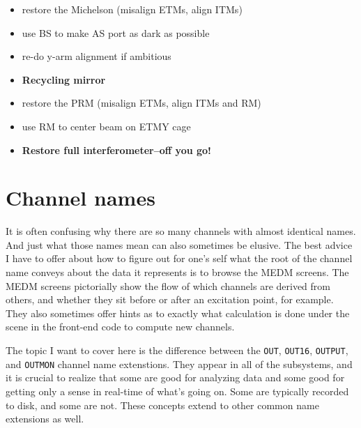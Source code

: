 \begin{itemize}
\item restore the Michelson (misalign ETMs, align ITMs) \vspace{-10pt}
\item use BS to make AS port as dark as possible \vspace{-10pt}
\item re-do y-arm alignment if ambitious 
\item[] \textbf{Recycling mirror} \vspace{-10pt}
\item restore the PRM (misalign ETMs, align ITMs and RM)
  \vspace{-10pt}
\item use RM to center beam on ETMY cage 
\item[] \textbf{Restore full interferometer--off you go!}
\end{itemize}



\section{Channel names}
It is often confusing why there are so many channels with almost
identical names. And just what those names mean can also sometimes be
elusive. The best advice I have to offer about how to figure out for
one's self what the root of the channel name conveys about the data it
represents is to browse the MEDM screens. The MEDM screens pictorially
show the flow of which channels are derived from others, and whether
they sit before or after an excitation point, for example. They also
sometimes offer hints as to exactly what calculation is done under the
scene in the front-end code to compute new channels. 

The topic I want to cover here is the difference between the
\texttt{OUT}, \texttt{OUT16}, \texttt{OUTPUT}, and \texttt{OUTMON}
channel name extenstions. They appear in all of the subsystems, and it
is crucial to realize that some are good for analyzing data and some
good for getting only a sense in real-time of what's going on. Some
are typically recorded to disk, and some are not. These concepts
extend to other common name extensions as well. 

